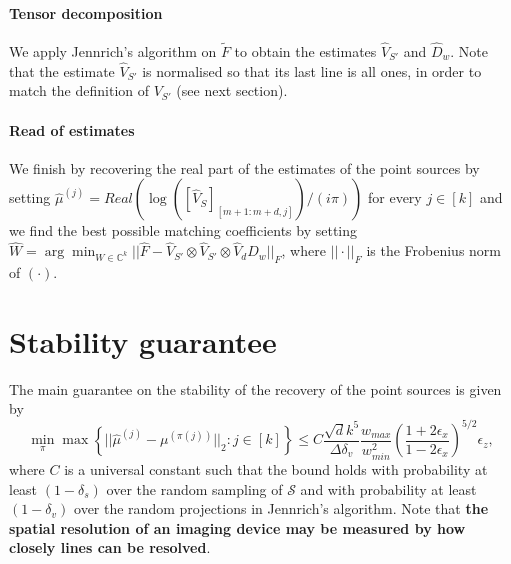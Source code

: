 \paragraph{Tensor decomposition} We apply Jennrich's algorithm on $\tilde{F}$ to obtain the estimates $\widehat{V}_{S'}$ and $\widehat{D}_w$. Note that the estimate $\widehat{V}_{S'}$ is normalised so that its last line is all ones, in order to match the definition of $V_{S'}$ (see next section).
\paragraph{Read of estimates} We finish by recovering the real part of the estimates of the point sources by setting $\widehat{\mu}^{(j)}=Real(\log([\widehat{V}_S]_{[m+1:m+d,j]})/(i\pi))$ for every $j\in[k]$ and we find the best possible matching coefficients by setting $\widehat{W}=\arg\min_{W\in\mathbb{C}^k}||\widehat{F}-\widehat{V}_{S'}\otimes\widehat{V}_{S'}\otimes \widehat{V}_dD_w||_F$, where $||\cdot||_F$ is the Frobenius norm of $(\cdot)$.
\section{Stability guarantee}
The main guarantee on the stability of the recovery of the point sources is given by $$\min_\pi\max\left\{||\widehat{\mu}^{(j)}-\mu^{(\pi(j))}||_2:j\in[k]\right\}\leq C\frac{\sqrt{d}k^5}{\Delta\delta_v}\frac{w_{max}}{w_{min}^2}\left(\frac{1+2\epsilon_x}{1-2\epsilon_x}\right)^{5/2}\epsilon_z,$$ where $C$ is a universal constant such that the bound holds with probability at least $(1-\delta_s)$ over the random sampling of $\mathcal{S}$ and with probability at least $(1-\delta_v)$ over the random projections in Jennrich's algorithm. Note that {\bf the spatial resolution of an imaging device may be measured by how closely lines can be resolved}.
